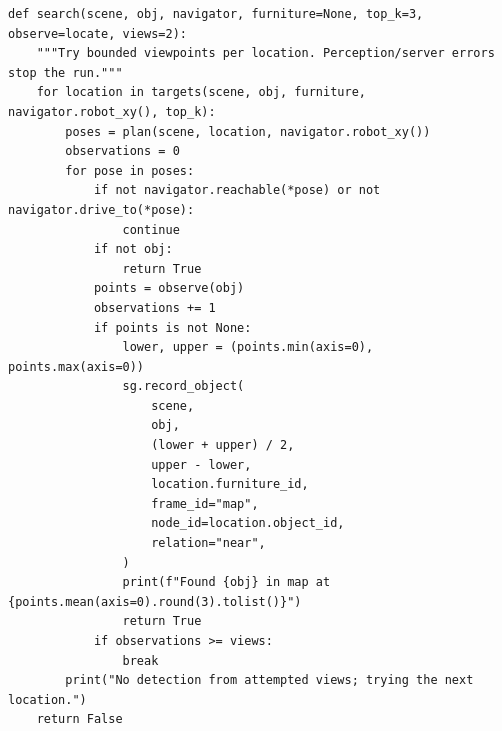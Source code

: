 \documentclass[11pt,a4paper]{book}
\begin{document}
\begin{lstlisting}[firstnumber=78]
def search(scene, obj, navigator, furniture=None, top_k=3, observe=locate, views=2):
    """Try bounded viewpoints per location. Perception/server errors stop the run."""
    for location in targets(scene, obj, furniture, navigator.robot_xy(), top_k):
        poses = plan(scene, location, navigator.robot_xy())
        observations = 0
        for pose in poses:
            if not navigator.reachable(*pose) or not navigator.drive_to(*pose):
                continue
            if not obj:
                return True
            points = observe(obj)
            observations += 1
            if points is not None:
                lower, upper = (points.min(axis=0), points.max(axis=0))
                sg.record_object(
                    scene,
                    obj,
                    (lower + upper) / 2,
                    upper - lower,
                    location.furniture_id,
                    frame_id="map",
                    node_id=location.object_id,
                    relation="near",
                )
                print(f"Found {obj} in map at {points.mean(axis=0).round(3).tolist()}")
                return True
            if observations >= views:
                break
        print("No detection from attempted views; trying the next location.")
    return False


\end{lstlisting}
\end{document}

